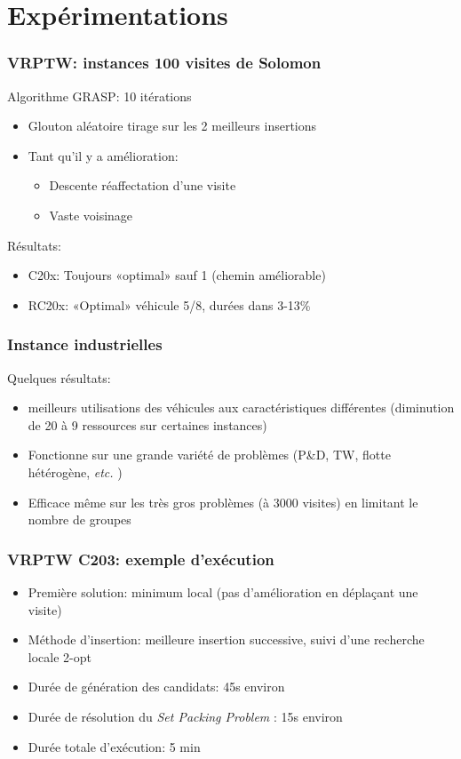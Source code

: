 \documentclass[table]{beamer}
\newcommand*{\foreign}[2][english]{%
    \emph{\foreignlanguage{#1}{#2}}%
}
\begin{document}
\section{Expérimentations}

\begin{frame}
  \frametitle{VRPTW: instances 100 visites de Solomon}

  Algorithme GRASP: 10 itérations
  \begin{itemize}
  \item Glouton aléatoire tirage sur les 2 meilleurs insertions
  \item Tant qu'il y a amélioration:
    \begin{itemize}
    \item Descente réaffectation d'une visite
    \item Vaste voisinage
    \end{itemize}
  \end{itemize}

  Résultats:
  \begin{itemize}
  \item C20x: Toujours «optimal» sauf 1 (chemin améliorable)
  \item RC20x: «Optimal» véhicule 5/8, durées dans 3-13\%
  \end{itemize}
\end{frame}

\begin{frame}
  \frametitle{Instance industrielles}

  Quelques résultats:
  \begin{itemize}
  \item meilleurs utilisations des véhicules aux caractéristiques
    différentes (diminution de 20 à 9 ressources sur certaines
    instances)
  \item Fonctionne sur une grande variété de problèmes (P\&D, TW,
    flotte hétérogène, \foreign{etc.})
  \item Efficace même sur les très gros problèmes (à 3000 visites) en
    limitant le nombre de groupes
  \end{itemize}
\end{frame}

\begin{frame}
  \frametitle{VRPTW C203: exemple d'exécution}

  \begin{itemize}
  \item Première solution: minimum local (pas d'amélioration en
    déplaçant une visite)
  \item Méthode d'insertion: meilleure insertion successive, suivi
    d'une recherche locale 2-opt
  \item Durée de génération des candidats: 45s environ
  \item Durée de résolution du \foreign{Set Packing Problem}: 15s environ
  \item Durée totale d'exécution: 5 min
  \end{itemize}
\end{frame}
\end{document}
